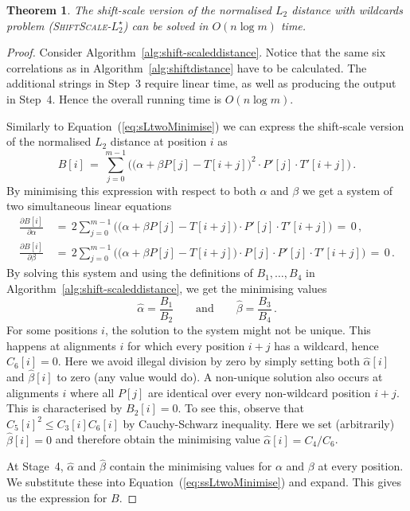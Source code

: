 \documentclass[11pt]{article}
\renewcommand{\leq}{\leqslant}
\newcommand{\wildcard}{\ensuremath{\star}\xspace}
\newcommand{\ssLtwoWild}{\textsc{ShiftScale-$L_2^\wildcard$}\xspace}
\theoremstyle{plain}
\newtheorem{theorem}{Theorem}[]
\theoremstyle{definition}
\begin{document}
\begin{theorem}
    \label{thm:ssLtwoWild}
    The shift-scale version of the normalised $L_2$ distance with wildcards problem (\ssLtwoWild) can be solved in $O(n\log{m})$ time.
\end{theorem}
\begin{proof}
    Consider Algorithm~\ref{alg:shift-scaleddistance}. Notice that the same six correlations as in Algorithm~\ref{alg:shiftdistance} have to be calculated. The additional strings in Step~3 require linear time, as well as producing the output in Step~4. Hence the overall running time is $O(n\log{m})$.

    Similarly to Equation~(\ref{eq:sLtwoMinimise}) we can express the shift-scale version of the normalised $L_2$ distance at position $i$ as
\begin{equation}
        \label{eq:ssLtwoMinimise}
        B[i] \,=\, \sum_{j=0}^{m-1} \Big( \big(\alpha + \beta P[j] - T[i+j]\big)^2 \cdot P'[j]\cdot T'[i+j] \Big) \,.
    \end{equation}
By minimising this expression with respect to both $\alpha$ and $\beta$ we get a system of two simultaneous linear equations
\begin{align*}
        \frac{\partial B[i]}{\partial \alpha} \,&=\, 2 \sum_{j=0}^{m-1} \Big( \big(\alpha + \beta P[j] - T[i+j] \big) \cdot P'[j] \cdot T'[i+j] \Big) \,=\, 0 \,, \\
        \frac{\partial B[i]}{\partial \beta} \,&=\, 2 \sum_{j=0}^{m-1} \Big( \big(\alpha + \beta P[j] - T[i+j] \big) \cdot P[j] \cdot P'[j] \cdot T'[i+j] \Big) \,=\, 0 \,.
    \end{align*}
By solving this system and using the definitions of $B_1,\dots,B_4$ in Algorithm~\ref{alg:shift-scaleddistance}, we get the minimising values
\begin{equation*}
        \widehat{\alpha} = \frac{B_1}{B_2} \qquad \text{and} \qquad \widehat{\beta} = \frac{B_3}{B_4} \,.
    \end{equation*}
For some positions $i$, the solution to the system might not be unique. This happens at alignments $i$ for which every position $i+j$ has a wildcard, hence $C_6[i]=0$. Here we avoid illegal division by zero by simply setting both $\widehat{\alpha}[i]$ and $\widehat{\beta}[i]$ to zero (any value would do). A non-unique solution also occurs at alignments $i$ where all $P[j]$ are identical over every non-wildcard position $i+j$. This is characterised by $B_2[i]=0$. To see this, observe that $ C_5[i]^2\leq C_3[i] C_6[i]$ by Cauchy-Schwarz inequality. Here we set (arbitrarily) $\widehat{\beta}[i]=0$ and therefore obtain the minimising value $\widehat{\alpha}[i]=C_4/C_6$.

    At Stage~4, $\widehat{\alpha}$ and $\widehat{\beta}$ contain the minimising values for $\alpha$ and $\beta$ at every position. We substitute these into Equation~(\ref{eq:ssLtwoMinimise}) and expand. This gives us the expression for $B$.
\end{proof}
\end{document}
